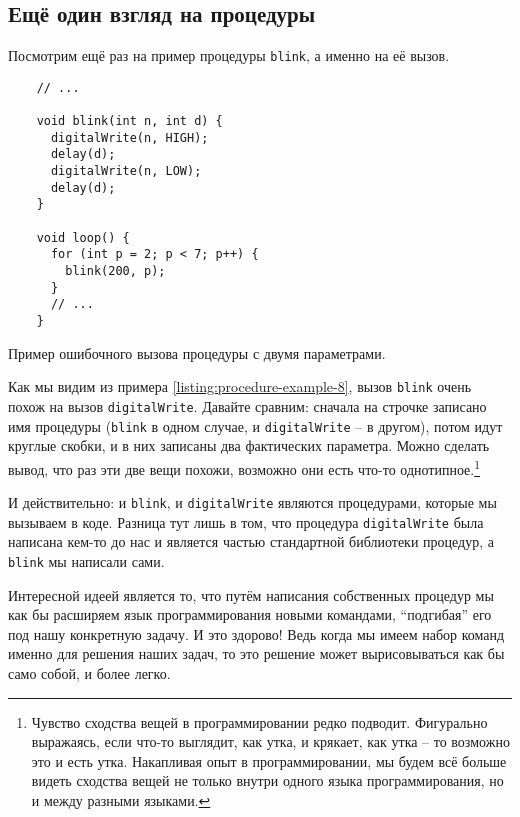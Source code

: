 \documentclass[../sparc.tex]{subfiles}
\begin{document}
\subsection{Ещё один взгляд на процедуры}

Посмотрим ещё раз на пример процедуры \texttt{blink}, а именно на её
вызов.

\begin{listing}[H]
  \begin{verbatim}
    // ...

    void blink(int n, int d) {
      digitalWrite(n, HIGH);
      delay(d);
      digitalWrite(n, LOW);
      delay(d);
    }

    void loop() {
      for (int p = 2; p < 7; p++) {
        blink(200, p);
      }
      // ...
    }
  \end{verbatim}
  \label{listing:procedure-example-8}
  \caption{Пример ошибочного вызова процедуры с двумя параметрами.}
\end{listing}

Как мы видим из примера \ref{listing:procedure-example-8}, вызов
\texttt{blink} очень похож на вызов \texttt{digitalWrite}.
Давайте сравним: сначала на строчке записано имя процедуры
(\texttt{blink} в одном случае, и \texttt{digitalWrite} -- в
другом), потом идут круглые скобки, и в них записаны два фактических параметра.
Можно сделать вывод, что раз эти две вещи похожи, возможно они есть что-то
однотипное.\footnote{Чувство сходства вещей в программировании редко подводит.
Фигурально выражаясь, если что-то выглядит, как утка, и крякает, как утка -- то
возможно это и есть утка.  Накапливая опыт в программировании, мы будем всё
больше видеть сходства вещей не только внутри одного языка программирования, но
и между разными языками.}

И действительно: и \texttt{blink}, и \texttt{digitalWrite}
являются процедурами, которые мы вызываем в коде.  Разница тут лишь в том, что
процедура \texttt{digitalWrite} была написана кем-то до нас и является
частью стандартной библиотеки процедур, а \texttt{blink} мы написали
сами.

Интересной идеей является то, что путём написания собственных процедур мы как бы
расширяем язык программирования новыми командами, ``подгибая'' его под нашу
конкретную задачу.  И это здорово!  Ведь когда мы имеем набор команд именно для
решения наших задач, то это решение может вырисовываться как бы само собой, и
более легко.
\end{document}
